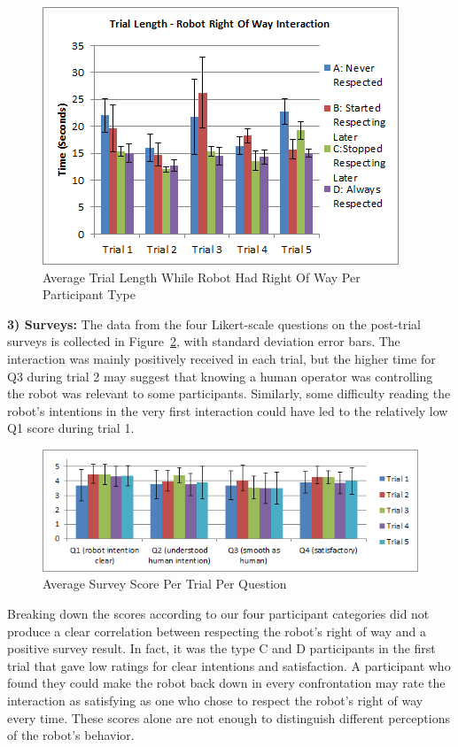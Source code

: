 \documentclass[letterpaper, 10 pt, conference]{ieeeconf}  %
\begin{document}
     \begin{figure}
      \centering
      \includegraphics{Robot_right.png}
      \caption{Average Trial Length While Robot Had Right Of Way Per Participant Type}
      \label{fig:Respect}
   \end{figure}

\textbf{3) Surveys:} The data from the four Likert-scale questions on the post-trial surveys is collected in Figure~\ref{fig:Questionnaire}, with standard deviation error bars. The interaction was mainly positively received in each trial, but the higher time for Q3 during trial 2 may suggest that knowing a human operator was controlling the robot was relevant to some participants. Similarly, some difficulty reading the robot's intentions in the very first interaction could have led to the relatively low Q1 score during trial 1.
 
     \begin{figure}
      \centering
      \includegraphics[width=\textwidth]{Questionnaire.png}
      \caption{Average Survey Score Per Trial Per Question }
      \label{fig:Questionnaire}
   \end{figure}
 
Breaking down the scores according to our four participant categories did not produce a clear correlation between respecting the robot's right of way and a positive survey result. In fact, it was the type C and D participants in the first trial that gave low ratings for clear intentions and satisfaction. A participant who found they could make the robot back down in every confrontation may rate the interaction as satisfying as one who chose to respect the robot's right of way every time. These scores alone are not enough to distinguish different perceptions of the robot's behavior.
\end{document}
